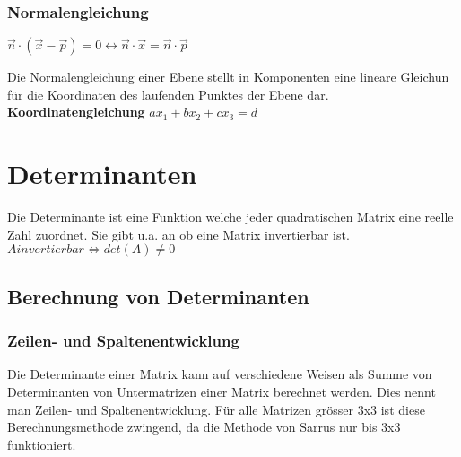 \documentclass[11pt,a4paper,onecolumn]{article}
\begin{document}
\begin{flushleft}
\subsubsection{Normalengleichung}
$ \vec{n} \cdot (\vec{x}-\vec{p}) = 0 \leftrightarrow \vec{n}\cdot \vec{x} = \vec{n} \cdot \vec{p} $ \linebreak

Die Normalengleichung einer Ebene stellt in Komponenten eine lineare Gleichun für die Koordinaten des laufenden Punktes der Ebene dar. \linebreak\linebreak
\textbf{Koordinatengleichung}\linebreak
$ax_{1}+bx_{2}+cx_{3} = d $


\section{Determinanten}
Die Determinante ist eine Funktion welche jeder quadratischen Matrix eine reelle Zahl zuordnet. Sie gibt u.a. an ob eine Matrix invertierbar ist.\linebreak
$ A invertierbar \Leftrightarrow det(A) \neq 0 $ \linebreak

\subsection{Berechnung von Determinanten}

\subsubsection{Zeilen- und Spaltenentwicklung}
Die Determinante einer Matrix kann auf verschiedene Weisen als Summe von Determinanten von Untermatrizen einer Matrix berechnet werden. Dies nennt man Zeilen- und Spaltenentwicklung. Für alle Matrizen grösser 3x3 ist diese Berechnungsmethode zwingend, da die Methode von Sarrus nur bis 3x3 funktioniert.\linebreak


\end{flushleft}
\end{document}

